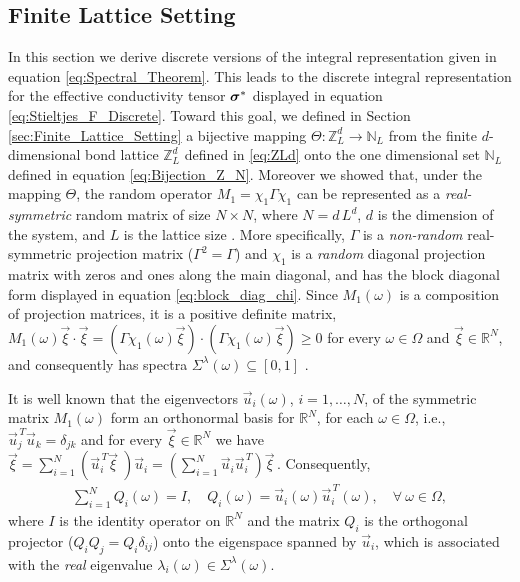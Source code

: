 \documentclass{cmslatex}
\newcommand\bsig{\mbox{\boldmath${\sigma}$}}
\begin{document}
\subsection{Finite Lattice Setting}
\label{sec:The_Spectral_Theorem_Finite_Lattice}
%
In this section we derive discrete versions of the integral
representation given in equation  \eqref{eq:Spectral_Theorem}. This
leads to the discrete integral representation for the effective
conductivity tensor $\bsig^*$ displayed in equation
\eqref{eq:Stieltjes_F_Discrete}. Toward this goal, we defined in
Section \ref{sec:Finite_Lattice_Setting} a bijective mapping
$\Theta:\mathbb{Z}_L^d\to\mathbb{N}_L$ from the finite $d$-dimensional bond
lattice $\mathbb{Z}_L^d$ defined in \eqref{eq:ZLd} onto the one
dimensional set $\mathbb{N}_L$ defined in equation
\eqref{eq:Bijection_Z_N}. Moreover we showed that, under the mapping
$\Theta$, the random operator $M_1=\chi_1\Gamma\chi_1$ can be represented as a
\emph{real-symmetric} random matrix of size $N\times N$, where $N=d\,L^d$,
$d$ is the dimension of the system, and $L$ is the lattice size
\cite{Golden:JBM:337,Murphy:JMP:063506}. More specifically, $\Gamma$
is a \emph{non-random} real-symmetric projection matrix ($\Gamma^2=\Gamma$) and
$\chi_1$ is a \emph{random} diagonal projection matrix with zeros and
ones along the main diagonal, and has the block diagonal form
displayed in equation \eqref{eq:block_diag_chi}. Since $M_1(\omega)$ is a
composition of projection matrices, it is a positive definite matrix,
$M_1(\omega)\vec{\xi}\cdot\vec{\xi}=(\Gamma\chi_1(\omega)\vec{\xi})\cdot(\Gamma\chi_1(\omega)\vec{\xi})\geq0$ for every
$\omega\in\Omega$ and $\vec{\xi}\in\mathbb{R}^N$, and consequently has spectra
$\Sigma^\lambda(\omega)\subseteq[0,1]$ \cite{Halmos-1958}.   






It is well known \cite{Halmos-1958,Keener-2000} that the eigenvectors
$\vec{u}_i(\omega)$, $i=1,\ldots,N$, of the symmetric matrix $M_1(\omega)$ form an orthonormal
basis for $\mathbb{R}^N$, for each $\omega\in\Omega$, i.e., 
$\vec{u}_j^{\,T}\vec{u}_k=\delta_{jk}$  and for every
$\vec{\xi}\in\mathbb{R}^N$ we have
$\vec{\xi}=\sum_{i=1}^N(\vec{u}_i^{\,T}\vec{\xi}\;)\vec{u}_i  
=\left(\sum_{i=1}^N\vec{u}_i\vec{u}_i^{\,T}\right)\vec{\xi}\,$. Consequently,       
%
\begin{align}\label{eq:Matrix_Rep_Spec_Theorem}
  \sum_{i=1}^NQ_i(\omega)=I, \quad
  Q_i(\omega)=\vec{u}_i(\omega)\vec{u}_i^{\,T}(\omega),  \quad
  \forall \     \omega\in\Omega,
\end{align}
%
where $I$ is the identity operator on $\mathbb{R}^N$ and the matrix
$Q_i$ is the orthogonal projector ($Q_iQ_j=Q_i\delta_{ij}$) onto the
eigenspace spanned by $\vec{u}_i$, which is associated with the
\emph{real} eigenvalue $\lambda_i(\omega)\in\Sigma^\lambda(\omega)$. 
\end{document}
